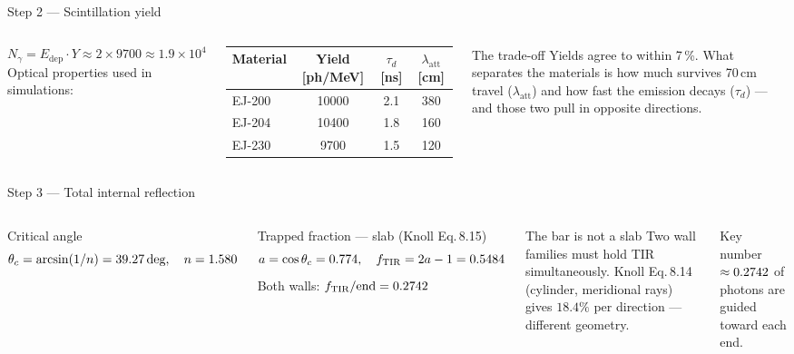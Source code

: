 \documentclass[aspectratio=169,9pt]{beamer}
\newcommand{\thetac}{\theta_c}
\newcommand{\fTIR}{f_{\mathrm{TIR}}}
\newcommand{\latt}{\lambda_{\mathrm{att}}}
\begin{document}
\begin{frame}{Step 2 — Scintillation yield}
  \begin{columns}[T]
      \[N_\gamma = E_{\mathrm{dep}}\cdot Y \approx 2\times 9700 \approx 1.9\times10^4\]
      {\small Optical properties used in simulations:}\\[4pt]
      {\footnotesize
      \setlength{\tabcolsep}{5pt}
      \begin{tabular}{@{}lccc@{}}
        \toprule
        Material & Yield [ph/MeV] & $\tau_d$ [ns] & $\latt$ [cm]\\
        \midrule
        EJ-200 & 10000 & 2.1 & 380\\
        EJ-204 & 10400 & 1.8 & 160\\
        EJ-230 & 9700  & 1.5 & 120\\
        \bottomrule
      \end{tabular}}

      \begin{block}{The trade-off}
        {\small Yields agree to within 7\,\%.  What separates the materials
        is how much survives 70\,cm travel ($\latt$) and how fast
        the emission decays ($\tau_d$) — and those two pull in opposite directions.}
      \end{block}
  \end{columns}
\end{frame}

\begin{frame}{Step 3 — Total internal reflection}
  \begin{columns}[T]
      \begin{block}{Critical angle}
        \[
          \thetac = \arcsin(1/n) = \Napthetacdeg,
          \quad n=\Napnpvt
        \]
      \end{block}
      \begin{block}{Trapped fraction — slab (Knoll Eq.\,8.15)}
        \[
          a = \cos\thetac = 0.774,\quad
          \fTIR = 2a - 1 = \NapfTIR
        \]
        Both walls: $\fTIR/\text{end} = \NapfTIRperend$
      \end{block}

      \begin{alertblock}{The bar is not a slab}
        {\small Two wall families must hold TIR simultaneously.
        Knoll Eq.\,8.14 (cylinder, meridional rays) gives $18.4\%$
        per direction — different geometry.}
      \end{alertblock}
      \begin{block}{Key number}
        {\small $\approx0.2742$ of photons are guided toward each end.}
      \end{block}
  \end{columns}
\end{frame}
\end{document}
